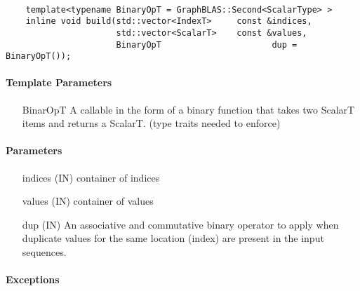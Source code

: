 \paragraph{\syntax}

\begin{verbatim}
    template<typename BinaryOpT = GraphBLAS::Second<ScalarType> >
    inline void build(std::vector<IndexT>     const &indices,
                      std::vector<ScalarT>    const &values,
                      BinaryOpT                      dup = BinaryOpT());
\end{verbatim}

\paragraph{Template Parameters}

\begin{itemize}[leftmargin=1.1in]
    \item[{\sf BinarOpT}]    A callable in the form of a binary function
                             that takes two ScalarT items and returns a ScalarT. (type traits needed to enforce)
\end{itemize}

\paragraph{Parameters}

\begin{itemize}[leftmargin=1.1in]
    \item[{\sf indices}]  ({\sf IN}) container of indices
    \item[{\sf values}]   ({\sf IN}) container of values
    \item[{\sf dup}]      ({\sf IN}) An associative and commutative binary operator
                                     to apply when duplicate values for the same
                                     location (index) are present in the input sequences.
\end{itemize}

\paragraph{Exceptions}

